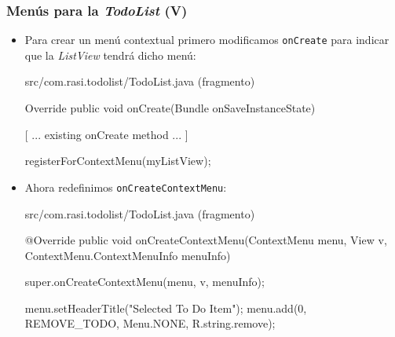 \documentclass[hyperref={pdfpagelabels=true},ucs]{beamer}
\begin{document}
\begin{frame}[fragile, shrink=5]
\frametitle{Menús para la \emph{TodoList} (V)}

\begin{itemize}
\item Para crear un menú contextual primero modificamos
  \verb|onCreate| para indicar que la \emph{ListView} tendrá dicho menú:

\begin{tiny}
\begin{block}{src/com.rasi.todolist/TodoList.java (fragmento)}
\begin{java}
  Override
   public void onCreate(Bundle onSaveInstanceState) {
 
  [ ... existing onCreate method ... ]

   registerForContextMenu(myListView);
}
\end{java}
\end{block}
\end{tiny}

\item Ahora redefinimos \verb|onCreateContextMenu|:

\begin{tiny}
\begin{block}{src/com.rasi.todolist/TodoList.java (fragmento)}
\begin{java}
@Override
public void onCreateContextMenu(ContextMenu menu,
                                View v,
                                ContextMenu.ContextMenuInfo menuInfo) {
  super.onCreateContextMenu(menu, v, menuInfo);
 
  menu.setHeaderTitle("Selected To Do Item");
  menu.add(0, REMOVE_TODO, Menu.NONE, R.string.remove);
}
\end{java}
\end{block}
\end{tiny}


\end{itemize}


\end{frame}
\end{document}
